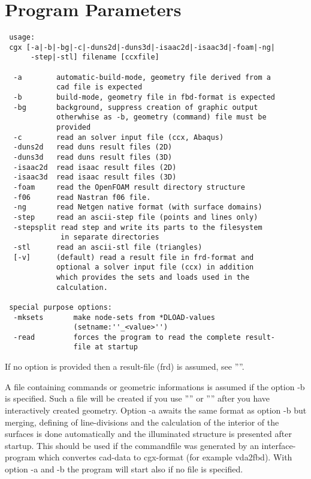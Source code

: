 \documentclass{article}
\begin{document}
\section{\label{Program Parameters}Program Parameters}
\begin{verbatim}
 usage:
 cgx [-a|-b|-bg|-c|-duns2d|-duns3d|-isaac2d|-isaac3d|-foam|-ng|
      -step|-stl] filename [ccxfile]

  -a        automatic-build-mode, geometry file derived from a 
            cad file is expected
  -b        build-mode, geometry file in fbd-format is expected
  -bg       background, suppress creation of graphic output
            otherwhise as -b, geometry (command) file must be
            provided
  -c        read an solver input file (ccx, Abaqus)              
  -duns2d   read duns result files (2D)                                  
  -duns3d   read duns result files (3D)
  -isaac2d  read isaac result files (2D)                                  
  -isaac3d  read isaac result files (3D)                                  
  -foam     read the OpenFOAM result directory structure
  -f06      read Nastran f06 file.    
  -ng       read Netgen native format (with surface domains)    
  -step     read an ascii-step file (points and lines only)                                  
  -stepsplit read step and write its parts to the filesystem
             in separate directories
  -stl      read an ascii-stl file (triangles)                                  
  [-v]      (default) read a result file in frd-format and
            optional a solver input file (ccx) in addition 
            which provides the sets and loads used in the
            calculation.

 special purpose options:                                               
  -mksets       make node-sets from *DLOAD-values 
                (setname:''_<value>'')
  -read         forces the program to read the complete result-
                file at startup
\end{verbatim}
If no option is provided then a result-file (frd) is assumed, see ''''.

A file containing commands or geometric informations is assumed if the option -b is specified. Such a file will be created if you use '''' or '''' after you have interactively created geometry. Option -a awaits the same format as option -b but merging, defining of line-divisions and the calculation of the interior of the surfaces is done automatically and the illuminated structure is presented after startup. This should be used if the commandfile was generated by an interface-program which convertes cad-data to cgx-format (for example vda2fbd). With option -a and -b the program will start also if no file is specified. 
\end{document}
